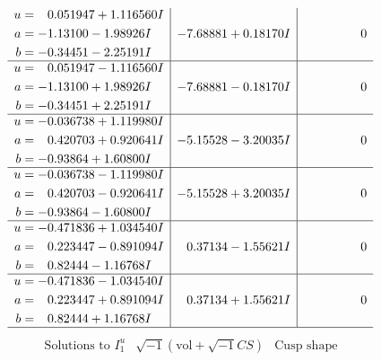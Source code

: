 \documentclass[1p]{elsarticle_modified}
\theoremstyle{definition}
\newcommand{\I}{\sqrt{-1}}
\begin{document}
$$\begin{array}{c|c|c}
\begin{aligned}
u &= \phantom{-}0.051947 + 1.116560 I \\
a &= -1.13100 - 1.98926 I \\
b &= -0.34451 - 2.25191 I\end{aligned}
 & -7.68881 + 0.18170 I & \phantom{-0.000000 } 0 \\ \hline\begin{aligned}
u &= \phantom{-}0.051947 - 1.116560 I \\
a &= -1.13100 + 1.98926 I \\
b &= -0.34451 + 2.25191 I\end{aligned}
 & -7.68881 - 0.18170 I & \phantom{-0.000000 } 0 \\ \hline\begin{aligned}
u &= -0.036738 + 1.119980 I \\
a &= \phantom{-}0.420703 + 0.920641 I \\
b &= -0.93864 + 1.60800 I\end{aligned}
 & -5.15528 - 3.20035 I & \phantom{-0.000000 } 0 \\ \hline\begin{aligned}
u &= -0.036738 - 1.119980 I \\
a &= \phantom{-}0.420703 - 0.920641 I \\
b &= -0.93864 - 1.60800 I\end{aligned}
 & -5.15528 + 3.20035 I & \phantom{-0.000000 } 0 \\ \hline\begin{aligned}
u &= -0.471836 + 1.034540 I \\
a &= \phantom{-}0.223447 - 0.891094 I \\
b &= \phantom{-}0.82444 - 1.16768 I\end{aligned}
 & \phantom{-}0.37134 - 1.55621 I & \phantom{-0.000000 } 0 \\ \hline\begin{aligned}
u &= -0.471836 - 1.034540 I \\
a &= \phantom{-}0.223447 + 0.891094 I \\
b &= \phantom{-}0.82444 + 1.16768 I\end{aligned}
 & \phantom{-}0.37134 + 1.55621 I & \phantom{-0.000000 } 0\\
 \hline 
 \end{array}$$\newpage$$\begin{array}{c|c|c}  
\text{Solutions to }I^u_{1}& \I (\text{vol} + \sqrt{-1}CS) & \text{Cusp shape}\\
 \hline 
\begin{aligned}

\end{aligned}
\end{array}$$
\end{document}
